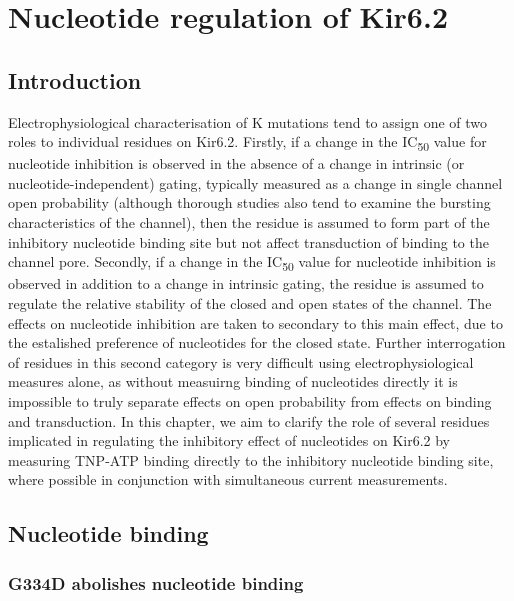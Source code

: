 \chapter{\label{ch:5}Nucleotide regulation of Kir6.2} 

\graphicspath{{figures/tempfigs/}}

\minitoc

\section{Introduction}

Electrophysiological characterisation of K\ATP{} mutations tend to assign one of two roles to individual residues on Kir6.2.
Firstly, if a change in the IC\textsubscript{50} value for nucleotide inhibition is observed in the absence of a change in intrinsic (or nucleotide-independent) gating, typically measured as a change in single channel open probability (although thorough studies also tend to examine the bursting characteristics of the channel), then the residue is assumed to form part of the inhibitory nucleotide binding site but not affect transduction of binding to the channel pore.
Secondly, if a change in the IC\textsubscript{50} value for nucleotide inhibition is observed in addition to a change in intrinsic gating, the residue is assumed to regulate the relative stability of the closed and open states of the channel.
The effects on nucleotide inhibition are taken to secondary to this main effect, due to the estalished preference of nucleotides for the closed state.
Further interrogation of residues in this second category is very difficult using electrophysiological measures alone, as without measuirng binding of nucleotides directly it is impossible to truly separate effects on open probability from effects on binding and transduction.
In this chapter, we aim to clarify the role of several residues implicated in regulating the inhibitory effect of nucleotides on Kir6.2 by measuring TNP-ATP
binding directly to the inhibitory nucleotide binding site, where possible in conjunction with simultaneous current measurements.

\section{Nucleotide binding}

\subsection{G334D abolishes nucleotide binding}

